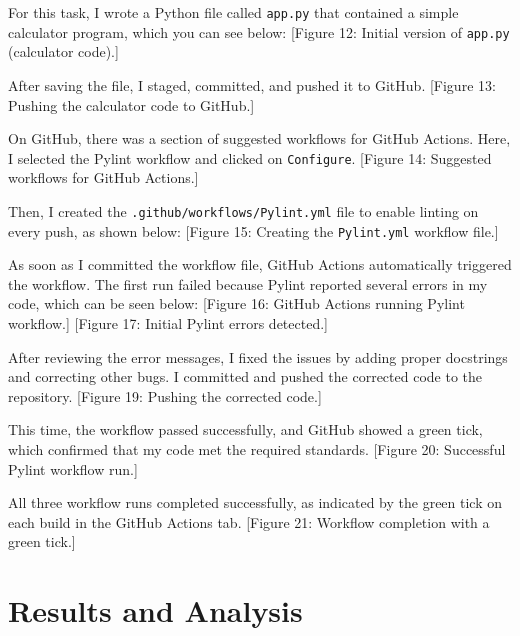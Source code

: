 \documentclass[10pt,a4paper]{report}
\begin{document}
For this task, I wrote a Python file called \texttt{app.py} that contained a simple calculator program, which you can see below:
[Figure 12: Initial version of \texttt{app.py} (calculator code).]

After saving the file, I staged, committed, and pushed it to GitHub.
[Figure 13: Pushing the calculator code to GitHub.]

On GitHub, there was a section of suggested workflows for GitHub Actions. Here, I selected the Pylint workflow and clicked on \texttt{Configure}.
[Figure 14: Suggested workflows for GitHub Actions.]

Then, I created the \texttt{.github/workflows/Pylint.yml} file to enable linting on every push, as shown below:
[Figure 15: Creating the \texttt{Pylint.yml} workflow file.]

As soon as I committed the workflow file, GitHub Actions automatically triggered the workflow. The first run failed because Pylint reported several errors in my code, which can be seen below:
[Figure 16: GitHub Actions running Pylint workflow.]
[Figure 17: Initial Pylint errors detected.]

After reviewing the error messages, I fixed the issues by adding proper docstrings and correcting other bugs. I committed and pushed the corrected code to the repository.
[Figure 19: Pushing the corrected code.]

\newpage
This time, the workflow passed successfully, and GitHub showed a green tick, which confirmed that my code met the required standards.
[Figure 20: Successful Pylint workflow run.]

All three workflow runs completed successfully, as indicated by the green tick on each build in the GitHub Actions tab.
[Figure 21: Workflow completion with a green tick.]



\section{Results and Analysis}
\end{document}
